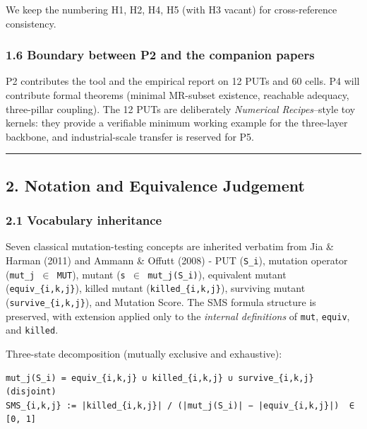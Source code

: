 \documentclass[review,12pt,authoryear]{elsarticle}
\begin{document}
We keep the numbering H1, H2, H4, H5 (with H3 vacant) for
cross-reference consistency.

\subsubsection{1.6 Boundary between P2 and the companion
papers}\label{boundary-between-p2-and-the-companion-papers}

P2 contributes the tool and the empirical report on 12 PUTs and 60
cells. P4 will contribute formal theorems (minimal MR-subset existence,
reachable adequacy, three-pillar coupling). The 12 PUTs are deliberately
\emph{Numerical Recipes}--style toy kernels: they provide a verifiable
minimum working example for the three-layer backbone, and
industrial-scale transfer is reserved for P5.

\begin{center}\rule{0.5\linewidth}{0.5pt}\end{center}

\subsection{2. Notation and Equivalence
Judgement}\label{notation-and-equivalence-judgement}

\subsubsection{2.1 Vocabulary inheritance}\label{vocabulary-inheritance}

Seven classical mutation-testing concepts are inherited verbatim from
Jia \& Harman (2011) and Ammann \& Offutt (2008) - PUT (\texttt{S\_i}),
mutation operator (\texttt{mut\_j\ $\in$\ MUT}), mutant
(\texttt{s\textquotesingle{}\ $\in$\ mut\_j(S\_i)}), equivalent mutant
(\texttt{equiv\_\{i,k,j\}}), killed mutant (\texttt{killed\_\{i,k,j\}}),
surviving mutant (\texttt{survive\_\{i,k,j\}}), and Mutation Score. The
SMS formula structure is preserved, with extension applied only to the
\emph{internal definitions} of \texttt{mut}, \texttt{equiv}, and
\texttt{killed}.

Three-state decomposition (mutually exclusive and exhaustive):

\begin{verbatim}
mut_j(S_i) = equiv_{i,k,j} ∪ killed_{i,k,j} ∪ survive_{i,k,j}   (disjoint)
SMS_{i,k,j} := |killed_{i,k,j}| / (|mut_j(S_i)| − |equiv_{i,k,j}|)  ∈ [0, 1]
\end{verbatim}
\end{document}
